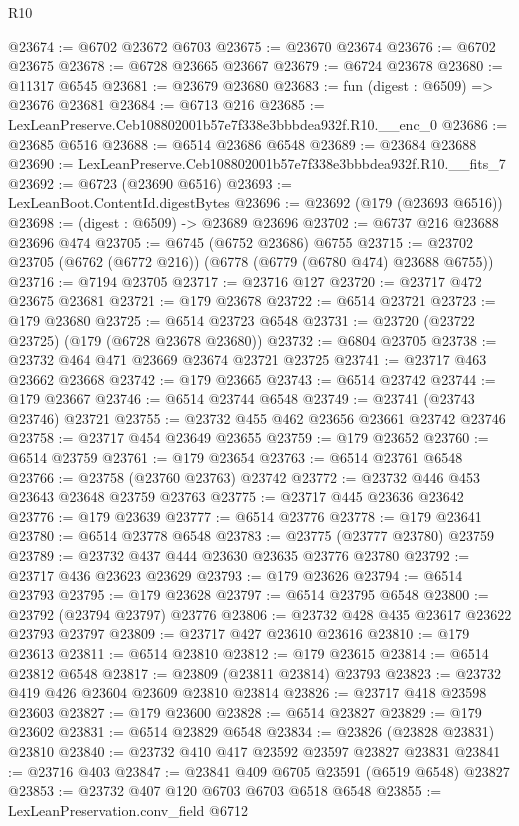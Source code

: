 \begin{lexlean}{R10}
\begin{coremodule}
@23674 := @6702 @23672 @6703
@23675 := @23670 @23674
@23676 := @6702 @23675
@23678 := @6728 @23665 @23667
@23679 := @6724 @23678
@23680 := @11317 @6545
@23681 := @23679 @23680
@23683 := fun (digest : @6509) => @23676 @23681
@23684 := @6713 @216
@23685 := LexLeanPreserve.Ceb108802001b57e7f338e3bbbdea932f.R10.__enc_0
@23686 := @23685 @6516
@23688 := @6514 @23686 @6548
@23689 := @23684 @23688
@23690 := LexLeanPreserve.Ceb108802001b57e7f338e3bbbdea932f.R10.__fits_7
@23692 := @6723 (@23690 @6516)
@23693 := LexLeanBoot.ContentId.digestBytes
@23696 := @23692 (@179 (@23693 @6516))
@23698 := (digest : @6509) -> @23689 @23696
@23702 := @6737 @216 @23688 @23696 @474
@23705 := @6745 (@6752 @23686) @6755
@23715 := @23702 @23705 (@6762 (@6772 @216)) (@6778 (@6779 (@6780 @474) @23688 @6755))
@23716 := @7194 @23705
@23717 := @23716 @127
@23720 := @23717 @472 @23675 @23681
@23721 := @179 @23678
@23722 := @6514 @23721
@23723 := @179 @23680
@23725 := @6514 @23723 @6548
@23731 := @23720 (@23722 @23725) (@179 (@6728 @23678 @23680))
@23732 := @6804 @23705
@23738 := @23732 @464 @471 @23669 @23674 @23721 @23725
@23741 := @23717 @463 @23662 @23668
@23742 := @179 @23665
@23743 := @6514 @23742
@23744 := @179 @23667
@23746 := @6514 @23744 @6548
@23749 := @23741 (@23743 @23746) @23721
@23755 := @23732 @455 @462 @23656 @23661 @23742 @23746
@23758 := @23717 @454 @23649 @23655
@23759 := @179 @23652
@23760 := @6514 @23759
@23761 := @179 @23654
@23763 := @6514 @23761 @6548
@23766 := @23758 (@23760 @23763) @23742
@23772 := @23732 @446 @453 @23643 @23648 @23759 @23763
@23775 := @23717 @445 @23636 @23642
@23776 := @179 @23639
@23777 := @6514 @23776
@23778 := @179 @23641
@23780 := @6514 @23778 @6548
@23783 := @23775 (@23777 @23780) @23759
@23789 := @23732 @437 @444 @23630 @23635 @23776 @23780
@23792 := @23717 @436 @23623 @23629
@23793 := @179 @23626
@23794 := @6514 @23793
@23795 := @179 @23628
@23797 := @6514 @23795 @6548
@23800 := @23792 (@23794 @23797) @23776
@23806 := @23732 @428 @435 @23617 @23622 @23793 @23797
@23809 := @23717 @427 @23610 @23616
@23810 := @179 @23613
@23811 := @6514 @23810
@23812 := @179 @23615
@23814 := @6514 @23812 @6548
@23817 := @23809 (@23811 @23814) @23793
@23823 := @23732 @419 @426 @23604 @23609 @23810 @23814
@23826 := @23717 @418 @23598 @23603
@23827 := @179 @23600
@23828 := @6514 @23827
@23829 := @179 @23602
@23831 := @6514 @23829 @6548
@23834 := @23826 (@23828 @23831) @23810
@23840 := @23732 @410 @417 @23592 @23597 @23827 @23831
@23841 := @23716 @403
@23847 := @23841 @409 @6705 @23591 (@6519 @6548) @23827
@23853 := @23732 @407 @120 @6703 @6703 @6518 @6548
@23855 := LexLeanPreservation.conv_field @6712

\end{coremodule}
\end{lexlean}
